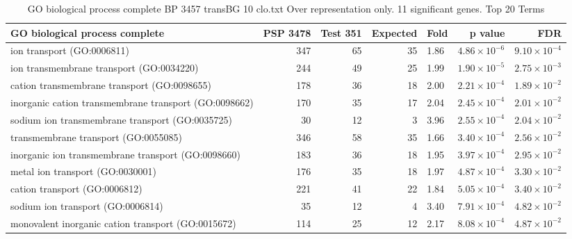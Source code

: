 \begin{table}[ht]
\centering
\begin{adjustbox}{width=\textwidth}
\begin{tabular}{lrrrlrr}
  \hline
GO biological process complete & PSP 3478 & Test 351 & Expected & Fold & p value & FDR \\ 
  \hline
ion transport (GO:0006811) & 347 & 65 & 35 & 1.86 & $4.86 \times 10^{-6}$ & $9.10 \times 10^{-4}$ \\ 
  ion transmembrane transport (GO:0034220) & 244 & 49 & 25 & 1.99 & $1.90 \times 10^{-5}$ & $2.75 \times 10^{-3}$ \\ 
  cation transmembrane transport (GO:0098655) & 178 & 36 & 18 & 2.00 & $2.21 \times 10^{-4}$ & $1.89 \times 10^{-2}$ \\ 
  inorganic cation transmembrane transport (GO:0098662) & 170 & 35 & 17 & 2.04 & $2.45 \times 10^{-4}$ & $2.01 \times 10^{-2}$ \\ 
  sodium ion transmembrane transport (GO:0035725) & 30 & 12 & 3 & 3.96 & $2.55 \times 10^{-4}$ & $2.04 \times 10^{-2}$ \\ 
  transmembrane transport (GO:0055085) & 346 & 58 & 35 & 1.66 & $3.40 \times 10^{-4}$ & $2.56 \times 10^{-2}$ \\ 
  inorganic ion transmembrane transport (GO:0098660) & 183 & 36 & 18 & 1.95 & $3.97 \times 10^{-4}$ & $2.95 \times 10^{-2}$ \\ 
  metal ion transport (GO:0030001) & 176 & 35 & 18 & 1.97 & $4.87 \times 10^{-4}$ & $3.30 \times 10^{-2}$ \\ 
  cation transport (GO:0006812) & 221 & 41 & 22 & 1.84 & $5.05 \times 10^{-4}$ & $3.40 \times 10^{-2}$ \\ 
  sodium ion transport (GO:0006814) & 35 & 12 & 4 & 3.40 & $7.91 \times 10^{-4}$ & $4.82 \times 10^{-2}$ \\ 
  monovalent inorganic cation transport (GO:0015672) & 114 & 25 & 12 & 2.17 & $8.08 \times 10^{-4}$ & $4.87 \times 10^{-2}$ \\ 
   \hline
\end{tabular}
\end{adjustbox}
\caption{GO biological process complete BP 3457 transBG 10 clo.txt Over representation only. 11 significant genes. Top 20 Terms} 
\label{tab:GO biological process complete BP 3457 transBG 10 clo.txt Over representation only. 11 significant genes. Top 20 Terms}
\end{table}


